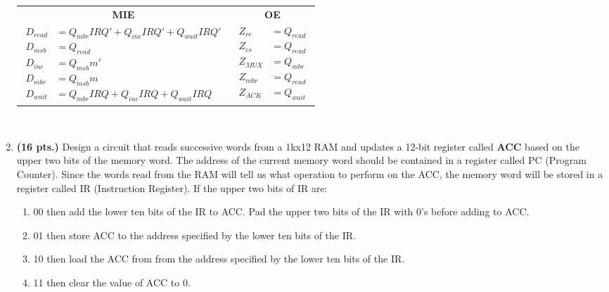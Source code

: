 \begin{enumerate}
\begin{onlysolution}[fragile]
            \begin{tabular}{cc}
                \textbf{MIE}                                           & \textbf{OE} \\
                {$
                    \begin{aligned}
                        D_{read} & = Q_{mbr}IRQ'+Q_{inc}IRQ' + Q_{wait}IRQ' \\
                        D_{msb}  & = Q_{read}                               \\
                        D_{inc}  & = Q_{msb} m'                             \\
                        D_{mbr}  & = Q_{msb} m                              \\
                        D_{wait} & = Q_{mbr}IRQ + Q_{inc}IRQ + Q_{wait}IRQ
                \end{aligned}$} &
                {$
                    \begin{aligned}
                        Z_{re}  & = Q_{read} \\
                        Z_{cs}  & = Q_{read} \\
                        Z_{MUX} & = Q_{mbr}  \\
                        Z_{mbr} & = Q_{read} \\
                        Z_{ACK} & = Q_{wait}
                \end{aligned}$}
            \end{tabular}\\
        \end{onlysolution}

    \item  \textbf{ (16 pts.)} Design a circuit that reads successive words from
        a 1kx12 RAM and updates a 12-bit register called \textbf{ACC} based on
        the upper two bits of the memory word.  The address of the current
        memory word should be contained in a register called PC (Program
        Counter).  Since the words read from the RAM will tell us what
        operation to perform on the ACC, the memory word will be stored in a
        register called IR (Instruction Register).  If the upper two bits of
        IR are:
        \begin{enumerate}
            \item  00 then add the lower ten bits of the IR to ACC.  Pad the
                upper two bits of the IR with 0's before adding to ACC.
            \item  01 then store ACC to the address specified by the lower ten
                bits of the IR.
            \item  10 then load the ACC from from the address specified by the
                lower ten bits of the IR.
            \item  11 then clear the value of ACC to 0.
        \end{enumerate}


\end{enumerate}
